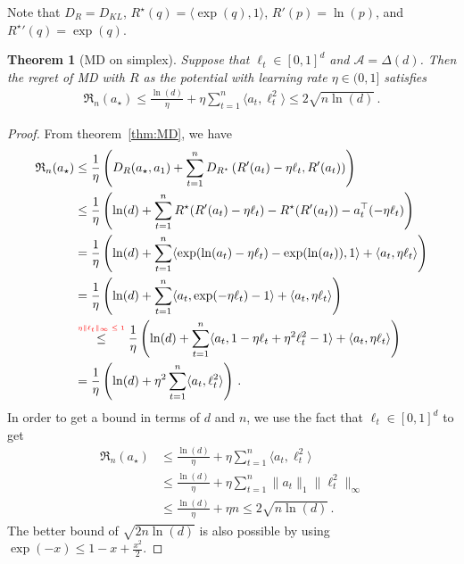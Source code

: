 \documentclass{article}
\theoremstyle{plain}
\newtheorem{theorem}{Theorem}
\theoremstyle{definition}
\newcommand{\Reg}{\mathfrak{R}}
\newcommand{\cA}{\mathcal A}
\newcommand{\abovelabel}[1]{\stackrel{\raisebox{0.5mm}{\textrm{\tiny \color{red} #1}}}}
\newcommand{\mdalg}{\textsf{MD}\xspace}
\begin{document}
Note that $D_R = D_{KL}$, $R^\star(q) = \langle \exp(q), 1\rangle$,
$R'(p) = \ln(p)$, and ${R^\star}'(q) = \exp(q)$.
\begin{theorem}[\mdalg on simplex]\label{thm:md-simplex}
    Suppose that $\ell_t \in [0,1]^d$ and $\cA = \Delta(d)$.
    Then the regret of \mdalg with $R$ as the potential
    with learning rate $\eta \in (0,1]$
    satisfies
    \begin{align*}
        \Reg_n(a_\star) \leq
        \frac{\ln(d)}{\eta}
        +
        \eta\sum_{t=1}^{n} \langle a_t, \ell_t^2\rangle
        \leq 2 \sqrt{n\ln(d)}\,.
    \end{align*}
\end{theorem}
\begin{proof}
    From theorem~\ref{thm:MD}, we have
    \begin{align*}
        \Reg_n(a_\star)
         & \leq
        \frac{1}{\eta}
        \left(
        D_R(a_\star, a_1) + \sum_{t=1}^{n} D_{R^\star}\left(R'(a_t) - \eta \ell_t, R'(a_t)\right)
        \right)
        \\
         & \leq
        \frac{1}{\eta}
        \left(
        \ln(d) + \sum_{t=1}^{n} R^\star(R'(a_t) - \eta \ell_t) - R^\star(R'(a_t)) - a_t^\top(-\eta \ell_t)
        \right)
        \\
         & =
        \frac{1}{\eta}
        \left(
        \ln(d) + \sum_{t=1}^{n} \langle \exp(\ln(a_t) - \eta \ell_t) - \exp(\ln(a_t)), 1 \rangle + \langle a_t, \eta \ell_t\rangle
        \right)
        \\
         & =
        \frac{1}{\eta}
        \left(
        \ln(d) + \sum_{t=1}^{n} \langle a_t, \exp(- \eta \ell_t) - 1 \rangle + \langle a_t, \eta \ell_t\rangle
        \right)
        \\
         &
        \abovelabel{$\eta \|\ell_t\|_\infty \leq 1$}
        \leq
        \frac{1}{\eta}
        \left(
        \ln(d) + \sum_{t=1}^{n} \langle a_t, 1 - \eta \ell_t + \eta^2 \ell_t^2 - 1 \rangle + \langle a_t, \eta \ell_t\rangle
        \right)
        \\
         &
        =
        \frac{1}{\eta}
        \left(
        \ln(d) + \eta^2\sum_{t=1}^{n} \langle a_t, \ell_t^2\rangle
        \right)\,.
    \end{align*}
    In order to get a bound in terms of $d$ and $n$,
    we use the fact that $\ell_t \in [0,1]^d$ to get
    \begin{align*}
        \Reg_n(a_\star) & \leq
        \frac{\ln(d)}{\eta}
        +
        \eta\sum_{t=1}^{n} \langle a_t, \ell_t^2\rangle \\
                        & \leq
        \frac{\ln(d)}{\eta}
        +
        \eta \sum_{t=1}^{n} \|a_t\|_1 \|\ell_t^2\|_\infty
        \\
                        & \leq
        \frac{\ln(d)}{\eta}
        +
        \eta n
        \leq 2 \sqrt{n\ln(d)}\,.
    \end{align*}
    The better bound of $\sqrt{2n\ln(d)}$ is also possible by using
    $\exp(-x) \leq 1 - x + \frac{x^2}{2}$.
\end{proof}
\end{document}
